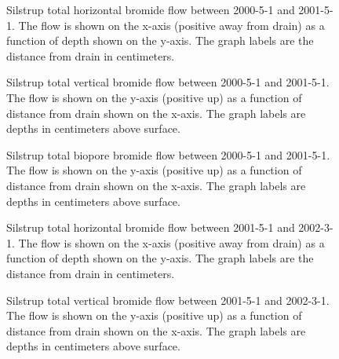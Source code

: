 \begin{figure}[htbp]
  \centering
  
  \caption{Silstrup total horizontal bromide flow between 2000-5-1 and
    2001-5-1.  The flow is shown on the x-axis (positive away from
    drain) as a function of depth shown on the y-axis.  The graph
    labels are the distance from drain in centimeters.}
  \label{fig:Silstrup-Bromide-2000-horizontal}
\end{figure}\FloatBarrier

\begin{figure}[htbp]
  \centering
  
  \caption{Silstrup total vertical bromide flow between 2000-5-1 and
    2001-5-1.  The flow is shown on the y-axis (positive up) as a
    function of distance from drain shown on the x-axis.  The graph
    labels are depths in centimeters above surface.}
  \label{fig:Silstrup-Bromide-2000-vertical}
\end{figure}\FloatBarrier

\begin{figure}[htbp]
  \centering
  
  \caption{Silstrup total biopore bromide flow between 2000-5-1 and
    2001-5-1.  The flow is shown on the y-axis (positive up) as a
    function of distance from drain shown on the x-axis.  The graph
    labels are depths in centimeters above surface.}
  \label{fig:Silstrup-Bromide-biopore-2000}
\end{figure}\FloatBarrier

\begin{figure}[htbp]
  \centering
  
  \caption{Silstrup total horizontal bromide flow between 2001-5-1 and
    2002-3-1.  The flow is shown on the x-axis (positive away from
    drain) as a function of depth shown on the y-axis.  The graph
    labels are the distance from drain in centimeters.}
  \label{fig:Silstrup-Bromide-2001-horizontal}
\end{figure}\FloatBarrier

\begin{figure}[htbp]
  \centering
  
  \caption{Silstrup total vertical bromide flow between 2001-5-1 and
    2002-3-1.  The flow is shown on the y-axis (positive up) as a
    function of distance from drain shown on the x-axis.  The graph
    labels are depths in centimeters above surface.}
  \label{fig:Silstrup-Bromide-2001-vertical}
\end{figure}\FloatBarrier

